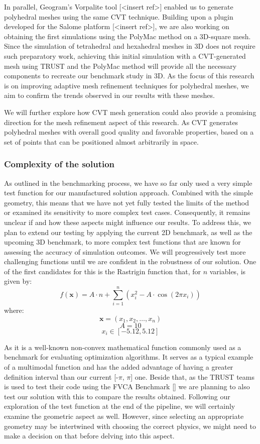\documentclass{article}
\begin{document}
In parallel, Geogram's Vorpalite tool [<insert ref>] enabled us to generate polyhedral meshes using the same CVT technique. Building upon a plugin developed for the Salome platform [<insert ref>], we are also working on obtaining the first simulations using the PolyMac method on a 3D-square mesh. Since the simulation of tetrahedral and hexahedral meshes in 3D does not require such preparatory work, achieving this initial simulation with a CVT-generated mesh using TRUST and the PolyMac method will provide all the necessary components to recreate our benchmark study in 3D. As the focus of this research is on improving adaptive mesh refinement techniques for polyhedral meshes, we aim to confirm the trends observed in our results with these meshes.

We will further explore how CVT mesh generation could also provide a promising direction for the mesh refinement aspect of this research. As CVT generates polyhedral meshes with overall good quality and favorable properties, based on a set of points that can be positioned almost arbitrarily in space.

\subsubsection{Complexity of the solution}
As outlined in the benchmarking process, we have so far only used a very simple test function for our manufactured solution approach. Combined with the simple geometry, this means that we have not yet fully tested the limits of the method or examined its sensitivity to more complex test cases. Consequently, it remains unclear if and how these aspects might influence our results. To address this, we plan to extend our testing by applying the current 2D benchmark, as well as the upcoming 3D benchmark, to more complex test functions that are known for assessing the accuracy of simulation outcomes. We will progressively test more challenging functions until we are confident in the robustness of our solution. One of the first candidates for this is the Rastrigin function that, for \(n\) variables, is given by:
\[
f(\mathbf{x}) = A \cdot n + \sum_{i=1}^{n} \left( x_i^2 - A \cdot \cos(2 \pi x_i) \right)
\]
where:
\[
\mathbf{x} = (x_1, x_2, \dots, x_n)
\]
\[
A = 10
\]
\[
x_i \in [-5.12, 5.12]
\]

As it is a well-known non-convex mathematical function commonly used as a benchmark for evaluating optimization algorithms. It serves as a typical example of a multimodal function and has the added advantage of having a greater definition interval than our current [-\(\pi\), \(\pi\)] one. Beside that, as the TRUST teams is used to test their code using the FVCA Benchmark [] we are planning to also test our solution with this to compare the results obtained.
Following our exploration of the test function at the end of the pipeline, we will certainly examine the geometric aspect as well. However, since selecting an appropriate geometry may be intertwined with choosing the correct physics, we might need to make a decision on that before delving into this aspect.
\end{document}
